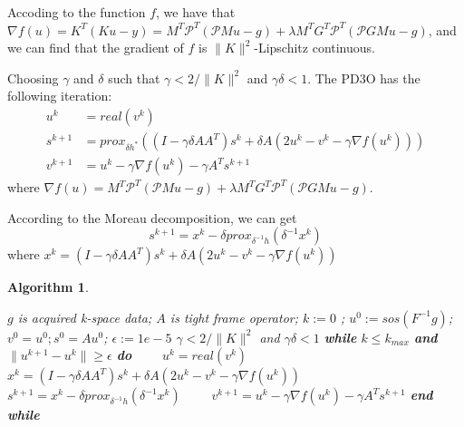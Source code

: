 \documentclass[UTF8]{article}
\newtheorem{algorithm}{Algorithm}
\renewcommand{\ge}{\geqslant}
\renewcommand{\ge}{\geqslant}
\begin{document}
\par Accoding to the function $f$, we have that $\nabla f(u) = K^T(Ku-y) = M^T \mathcal{P}^T (\mathcal{P}Mu-g) + \lambda M^T G^T \mathcal{P}^T(\mathcal{P}GMu-g)$, and we can find that the gradient of $f$ is $\|K\|^2$-Lipschitz continuous.

Choosing $\gamma $ and $\delta$ such that $\gamma < 2/ \|K\|^2$ and $\gamma \delta < 1$. The PD3O has the following iteration:
\begin{align*}
	u^{k} & = real(v^k)\\
	s^{k+1} &= prox_{\delta h^*} ((I-\gamma \delta AA^T)s^k + \delta A(2u^k-v^k-\gamma \nabla f(u^k)))\\
	v^{k+1} &= u^k-\gamma \nabla f(u^k) - \gamma A^T s^{k+1}
\end{align*}
where $\nabla f(u) = M^T \mathcal{P}^T (\mathcal{P}Mu-g) + \lambda M^T G^T \mathcal{P}^T(\mathcal{P}GMu-g)$.

According to the Moreau decomposition, we can get 
\begin{equation}
	s^{k+1} = x^k - \delta prox_{\delta^{-1} h} (\delta^{-1} x^k)
\end{equation}
where $x^k = (I-\gamma \delta AA^T)s^k + \delta A(2u^k-v^k-\gamma \nabla f(u^k))$
\begin{algorithm}
	\caption{\textbf{Double Domain Reconstruction Algorithm}}
	\label{Alg:scanMatching}
	\begin{algorithmic}[1]
		\Require 
		$g$ is acquired k-space data; $A$ is tight frame operator;
		$k:= 0$ ; $u^0:= sos(F^{-1}g)$; $v^0 = u^0; s^0 = Au^0$; $\epsilon:=1e-5$
		\Ensure $\gamma < 2/ \|K\|^2$ and $\gamma \delta < 1$
		\State \textbf{while}  $k \leq k_{max}$ \textbf{and} $\|u^{k+1} - u^{k}\| \ge \epsilon$ \textbf{do}  
		\State \ \ \ \ $u^{k} = real(v^{k})$
		\State \ \ \ \ $x^k = (I-\gamma \delta AA^T)s^k + \delta A(2u^k-v^k-\gamma \nabla f(u^k))$
		\State \ \ \ \ $s^{k+1} = x^k - \delta prox_{\delta^{-1} h} (\delta^{-1} x^k)$
		\State \ \ \ \ $ v^{k+1} = u^k-\gamma \nabla f(u^k) - \gamma A^T s^{k+1}$		
		\State \textbf{end while} 
	\end{algorithmic}
\end{algorithm}
\end{document}
